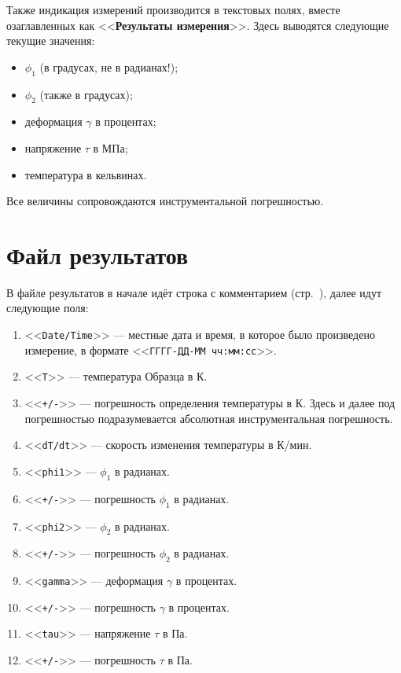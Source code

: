 \documentclass[12pt, a4paper, twocolumn]{book}
\newcommand{\CTL}[1]{<<{\bf #1}>>}
\newcommand{\CMD}[1]{<<{\tt #1}>>}
\begin{document}
Также индикация измерений производится в текстовых полях, вместе озаглавленных как \CTL{Результаты измерения}. Здесь выводятся следующие текущие значения:

\begin{itemize}
\item $\phi_1$ (в градусах, не в радианах!);
\item $\phi_2$ (также в градусах);
\item деформация $\gamma$ в процентах;
\item напряжение $\tau$ в МПа;
\item температура в кельвинах.
\end{itemize}

Все величины сопровождаются инструментальной погрешностью.

\section{Файл результатов}

В файле результатов в начале идёт строка с комментарием (стр.~\pageref{sec_dut_comment}), далее идут следующие поля:

\begin{enumerate}
\item \CMD{Date/Time} --- местные дата и время, в которое было произведено измерение, в формате \mbox{\CMD{ГГГГ-ДД-ММ чч:мм:сс}}.
\item \CMD{T} --- температура Образца в К.
\item \CMD{+/-} --- погрешность определения температуры в К. Здесь и далее под погрешностью подразумевается абсолютная инструментальная погрешность.
\item \CMD{dT/dt} --- скорость изменения температуры в К/мин.
\item \CMD{phi1} --- $\phi_1$ в радианах.
\item \CMD{+/-} --- погрешность $\phi_1$ в радианах.
\item \CMD{phi2} --- $\phi_2$ в радианах.
\item \CMD{+/-} --- погрешность $\phi_2$ в радианах.
\item \CMD{gamma} --- деформация $\gamma$ в процентах.
\item \CMD{+/-} --- погрешность $\gamma$ в процентах.
\item \CMD{tau} --- напряжение $\tau$ в Па.
\item \CMD{+/-} --- погрешность $\tau$ в Па.
\end{enumerate}
\end{document}
